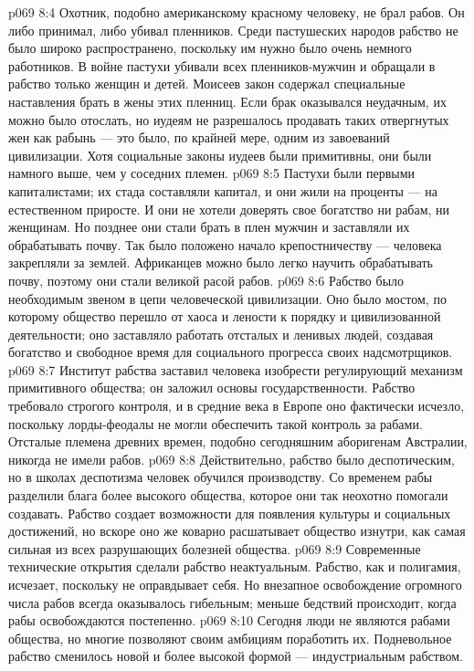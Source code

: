 \vs p069 8:4 Охотник, подобно американскому красному человеку, не брал рабов. Он либо принимал, либо убивал пленников. Среди пастушеских народов рабство не было широко распространено, поскольку им нужно было очень немного работников. В войне пастухи убивали всех пленников\hyp{}мужчин и обращали в рабство только женщин и детей. Моисеев закон содержал специальные наставления брать в жены этих пленниц. Если брак оказывался неудачным, их можно было отослать, но иудеям не разрешалось продавать таких отвергнутых жен как рабынь --- это было, по крайней мере, одним из завоеваний цивилизации. Хотя социальные законы иудеев были примитивны, они были намного выше, чем у соседних племен.
\vs p069 8:5 Пастухи были первыми капиталистами; их стада составляли капитал, и они жили на проценты --- на естественном приросте. И они не хотели доверять свое богатство ни рабам, ни женщинам. Но позднее они стали брать в плен мужчин и заставляли их обрабатывать почву. Так было положено начало крепостничеству --- человека закрепляли за землей. Африканцев можно было легко научить обрабатывать почву, поэтому они стали великой расой рабов.
\vs p069 8:6 \pc Рабство было необходимым звеном в цепи человеческой цивилизации. Оно было мостом, по которому общество перешло от хаоса и лености к порядку и цивилизованной деятельности; оно заставляло работать отсталых и ленивых людей, создавая богатство и свободное время для социального прогресса своих надсмотрщиков.
\vs p069 8:7 Институт рабства заставил человека изобрести регулирующий механизм примитивного общества; он заложил основы государственности. Рабство требовало строгого контроля, и в средние века в Европе оно фактически исчезло, поскольку лорды\hyp{}феодалы не могли обеспечить такой контроль за рабами. Отсталые племена древних времен, подобно сегодняшним аборигенам Австралии, никогда не имели рабов.
\vs p069 8:8 Действительно, рабство было деспотическим, но в школах деспотизма человек обучился производству. Со временем рабы разделили блага более высокого общества, которое они так неохотно помогали создавать. Рабство создает возможности для появления культуры и социальных достижений, но вскоре оно же коварно расшатывает общество изнутри, как самая сильная из всех разрушающих болезней общества.
\vs p069 8:9 \pc Современные технические открытия сделали рабство неактуальным. Рабство, как и полигамия, исчезает, поскольку не оправдывает себя. Но внезапное освобождение огромного числа рабов всегда оказывалось гибельным; меньше бедствий происходит, когда рабы освобождаются постепенно.
\vs p069 8:10 \pc Сегодня люди не являются рабами общества, но многие позволяют своим амбициям поработить их. Подневольное рабство сменилось новой и более высокой формой --- индустриальным рабством.
